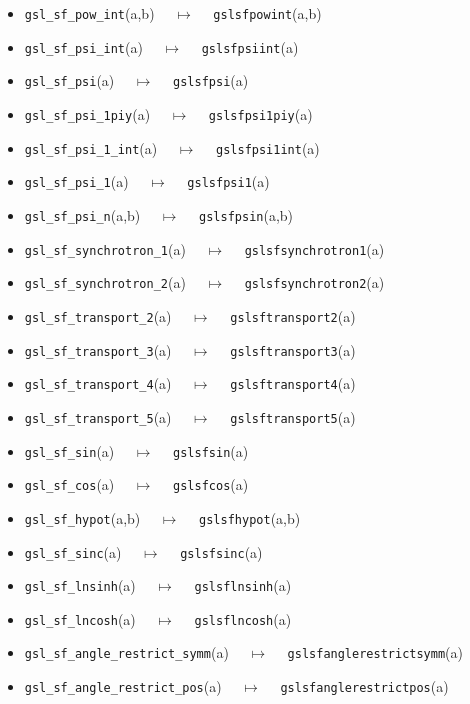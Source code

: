 \documentclass[a4paper,twoside,12pt]{book}
\begin{document}
{\begin{itemize}
\item \texttt{gsl\_sf\_pow\_int}(a,b) $\quad \mapsto\quad $ \texttt{gslsfpowint}(a,b) 
\item \texttt{gsl\_sf\_psi\_int}(a) $\quad \mapsto\quad $ \texttt{gslsfpsiint}(a) 
\item \texttt{gsl\_sf\_psi}(a) $\quad \mapsto\quad $ \texttt{gslsfpsi}(a) 
\item \texttt{gsl\_sf\_psi\_1piy}(a) $\quad \mapsto\quad $ \texttt{gslsfpsi1piy}(a) 
\item \texttt{gsl\_sf\_psi\_1\_int}(a) $\quad \mapsto\quad $ \texttt{gslsfpsi1int}(a) 
\item \texttt{gsl\_sf\_psi\_1}(a) $\quad \mapsto\quad $ \texttt{gslsfpsi1}(a) 
\item \texttt{gsl\_sf\_psi\_n}(a,b) $\quad \mapsto\quad $ \texttt{gslsfpsin}(a,b) 
\item \texttt{gsl\_sf\_synchrotron\_1}(a) $\quad \mapsto\quad $ \texttt{gslsfsynchrotron1}(a) 
\item \texttt{gsl\_sf\_synchrotron\_2}(a) $\quad \mapsto\quad $ \texttt{gslsfsynchrotron2}(a) 
\item \texttt{gsl\_sf\_transport\_2}(a) $\quad \mapsto\quad $ \texttt{gslsftransport2}(a) 
\item \texttt{gsl\_sf\_transport\_3}(a) $\quad \mapsto\quad $ \texttt{gslsftransport3}(a) 
\item \texttt{gsl\_sf\_transport\_4}(a) $\quad \mapsto\quad $ \texttt{gslsftransport4}(a) 
\item \texttt{gsl\_sf\_transport\_5}(a) $\quad \mapsto\quad $ \texttt{gslsftransport5}(a) 
\item \texttt{gsl\_sf\_sin}(a) $\quad \mapsto\quad $ \texttt{gslsfsin}(a) 
\item \texttt{gsl\_sf\_cos}(a) $\quad \mapsto\quad $ \texttt{gslsfcos}(a) 
\item \texttt{gsl\_sf\_hypot}(a,b) $\quad \mapsto\quad $ \texttt{gslsfhypot}(a,b) 
\item \texttt{gsl\_sf\_sinc}(a) $\quad \mapsto\quad $ \texttt{gslsfsinc}(a) 
\item \texttt{gsl\_sf\_lnsinh}(a) $\quad \mapsto\quad $ \texttt{gslsflnsinh}(a) 
\item \texttt{gsl\_sf\_lncosh}(a) $\quad \mapsto\quad $ \texttt{gslsflncosh}(a) 
\item \texttt{gsl\_sf\_angle\_restrict\_symm}(a) $\quad \mapsto\quad $ \texttt{gslsfanglerestrictsymm}(a) 
\item \texttt{gsl\_sf\_angle\_restrict\_pos}(a) $\quad \mapsto\quad $ \texttt{gslsfanglerestrictpos}(a) 

\end{itemize}}
\end{document}
